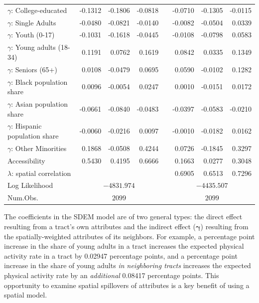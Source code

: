 \documentclass[shortAfour,sageh.bst]{sagej}
\begin{document}
\begin{table}
\begin{tabular}{l d{2.4} d{2.4} d{2.4} c d{2.4} d{2.4} d{2.4} }
  $\gamma$: College-educated & -0.1312 & -0.1806 & -0.0818 &   & -0.0710 & -0.1305 & -0.0115 \\
  $\gamma$: Single Adults & -0.0480 & -0.0821 & -0.0140 &   & -0.0082 & -0.0504 & 0.0339 \\
  $\gamma$: Youth (0-17) & -0.1031 & -0.1618 & -0.0445 &   & -0.0108 & -0.0798 & 0.0583 \\
  $\gamma$: Young adults (18-34) & 0.1191 & 0.0762 & 0.1619 &   & 0.0842 & 0.0335 & 0.1349 \\
  $\gamma$: Seniors (65+) & 0.0108 & -0.0479 & 0.0695 &   & 0.0590 & -0.0102 & 0.1282 \\
  $\gamma$: Black population share & 0.0096 & -0.0054 & 0.0247 &   & 0.0010 & -0.0151 & 0.0172 \\
  $\gamma$: Asian population share & -0.0661 & -0.0840 & -0.0483 &   & -0.0397 & -0.0583 & -0.0210 \\
  $\gamma$: Hispanic population share & -0.0060 & -0.0216 & 0.0097 &   & -0.0010 & -0.0182 & 0.0162 \\
  $\gamma$: Other Minorities & 0.1868 & -0.0508 & 0.4244 &   & 0.0726 & -0.1845 & 0.3297 \\
  Accessibility & 0.5430 & 0.4195 & 0.6666 &   & 0.1663 & 0.0277 & 0.3048 \\
  $\lambda$: spatial correlation &  &  &  &   & 0.6905 & 0.6513 & 0.7296 \\

\midrule
Log Likelihood &  & & \\
Num.Obs.       &    & & \\
\bottomrule
\end{tabular}
\end{table}

The coefficients in the SDEM model are of two general types: the direct
effect resulting from a tract's own attributes and the indirect effect
(\(\boldsymbol{\gamma}\)) resulting from the spatially-weighted
attributes of its neighbors. For example, a percentage point increase in
the share of young adults in a tract increases the expected physical
activity rate in a tract by 0.02947 percentage points, and a percentage
point increase in the share of young adults \emph{in neighboring tracts}
increases the expected physical activity rate by an \emph{additional}
0.08417 percentage points. This opportunity to examine spatial
spillovers of attributes is a key benefit of using a spatial model.
\end{document}
